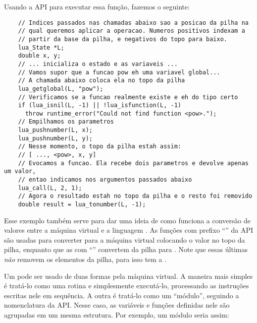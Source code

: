       Usando a API para executar essa função, fazemos o seguinte:
      
      \vspace{1em}

    \begin{lstlisting}
    // Indices passados nas chamadas abaixo sao a posicao da pilha na
    // qual queremos aplicar a operacao. Numeros positivos indexam a
    // partir da base da pilha, e negativos do topo para baixo.
    lua_State *L;
    double x, y;
    // ... inicializa o estado e as variaveis ...
    // Vamos supor que a funcao pow eh uma variavel global...
    // A chamada abaixo coloca ela no topo da pilha
    lua_getglobal(L, "pow");
    // Verificamos se a funcao realmente existe e eh do tipo certo
    if (lua_isnil(L, -1) || !lua_isfunction(L, -1)
      throw runtime_error("Could not find function <pow>.");
    // Empilhamos os parametros
    lua_pushnumber(L, x);
    lua_pushnumber(L, y);
    // Nesse momento, o topo da pilha estah assim:
    // [ ..., <pow>, x, y]
    // Evocamos a funcao. Ela recebe dois parametros e devolve apenas um valor,
    // entao indicamos nos argumentos passados abaixo
    lua_call(L, 2, 1);
    // Agora o resultado estah no topo da pilha e o resto foi removido
    double result = lua_tonumber(L, -1);
    \end{lstlisting}
      
      \vspace{1em}

      Esse exemplo também serve para dar uma ideia de como funciona a conversão
      de valores entre a máquina virtual  e a linguagem
      \C{}\footnotemark{}. As funções com prefixo ``'' da API
      são usadas para converter para a máquina virtual colocando o valor no topo
      da pilha, enquanto que as com ``'' convertem da pilha para
      \C{}. Note que essas últimas \emph{não} removem os elementos da pilha, para isso
      tem a .


      Um \script{}  pode ser usado de duas formas pela máquina
      virtual. A maneira mais simples é tratá-lo como uma rotina e simplesmente
      executá-lo, processando as instruções escritas nele em sequência. A outra
      é tratá-lo como um ``módulo'', seguindo a nomenclatura da API. Nesse caso,
      as variáveis e funções definidas nele são agrupadas em um mesma estrutura.
      Por exemplo, um módulo seria assim:
      
